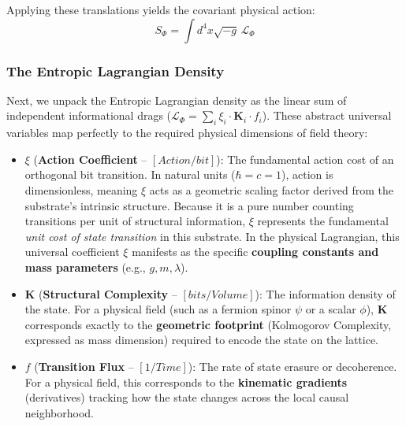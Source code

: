 Applying these translations yields the covariant physical action:
\begin{equation}
    S_\Phi = \int d^4x\sqrt{-g} \, \mathcal{L}_\Phi
\end{equation}

\subsubsection{The Entropic Lagrangian Density}
\label{sec:entropic_lagrangian_density}
Next, we unpack the Entropic Lagrangian density as the linear sum of independent informational drags ($\mathcal{L}_\Phi = \sum_i \xi_i \cdot \mathbf{K}_i \cdot f_i$). These abstract universal variables map perfectly to the required physical dimensions of field theory:

\begin{itemize}
    \item $\xi$ (\textbf{Action Coefficient} -- $[Action / bit]$): The fundamental action cost of an orthogonal bit transition. In natural units ($\hbar = c = 1$), action is dimensionless, meaning $\xi$ acts as a geometric scaling factor derived from the substrate's intrinsic structure. Because it is a pure number counting transitions per unit of structural information, $\xi$ represents the fundamental \textit{unit cost of state transition} in this substrate. In the physical Lagrangian, this universal coefficient $\xi$ manifests as the specific \textbf{coupling constants and mass parameters} (e.g., $g, m, \lambda$).
    
    \item $\mathbf{K}$ (\textbf{Structural Complexity} -- $[bits / Volume]$): The information density of the state. For a physical field (such as a fermion spinor $\psi$ or a scalar $\phi$), $\mathbf{K}$ corresponds exactly to the \textbf{geometric footprint} (Kolmogorov Complexity, expressed as mass dimension) required to encode the state on the lattice.
    
    \item $f$ (\textbf{Transition Flux} -- $[1/Time]$): The rate of state erasure or decoherence. For a physical field, this corresponds to the \textbf{kinematic gradients} (derivatives) tracking how the state changes across the local causal neighborhood.
\end{itemize}

